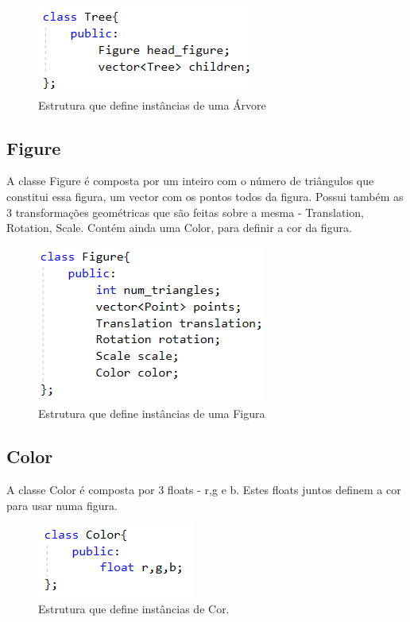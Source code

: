\documentclass[a4paper]{article}
\begin{document}
\begin{figure}[H]
\centering
\includegraphics[scale=0.8]{tree.png}
\caption{Estrutura que define instâncias de uma Árvore}
\label{img:Tree}
\end{figure}


\subsection{Figure}
\label{sec:figure}

A classe Figure é composta por um inteiro com o número de triângulos que constitui essa figura, um vector com os pontos todos da figura. Possui também as 3 transformações geométricas que são feitas sobre a mesma - Translation, Rotation, Scale. Contém ainda uma Color, para definir a cor da figura.

\begin{figure}[H]
\centering
\includegraphics[scale=0.8]{figure.png}
\caption{Estrutura que define instâncias de uma Figura}
\label{img:Figure}
\end{figure}


\subsection{Color}
\label{sec:color}

A classe Color é composta por 3 floats - r,g e b. Estes floats juntos definem a cor para usar numa figura.

\begin{figure}[H]
\centering
\includegraphics[scale=0.8]{color.png}
\caption{Estrutura que define instâncias de Cor.}
\label{img:Color}
\end{figure}
\end{document}
